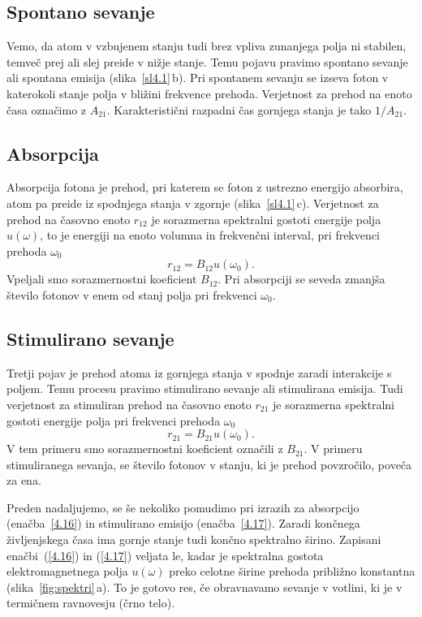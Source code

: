 \subsection*{Spontano sevanje}
Vemo, da atom v vzbujenem stanju tudi brez vpliva zunanjega polja
ni stabilen, temveč prej ali slej preide v nižje stanje. Temu pojavu
pravimo spontano sevanje ali spontana emisija (slika~\ref{sl4.1}\,b). 
Pri spontanem sevanju se izseva foton v katerokoli stanje polja v bližini 
frekvence prehoda. Verjetnost za prehod na enoto časa označimo z $A_{21}$.
Karakteristični razpadni čas gornjega stanja je tako
$1/A_{21}$.

\subsection*{Absorpcija}
Absorpcija fotona je prehod, pri katerem se foton 
z ustrezno energijo absorbira, atom pa preide iz spodnjega stanja v zgornje (slika~\ref{sl4.1}\,c). 
Verjetnost za prehod na časovno enoto $r_{12}$ je sorazmerna spektralni gostoti
energije polja $u(\omega)$, to je energiji na enoto volumna in frekvenčni interval, 
pri frekvenci prehoda $\omega_{0}$
\begin{equation}
r_{12}=B_{12}u(\omega_{0}).
\label{4.16}
\end{equation}
Vpeljali smo sorazmernostni koeficient $B_{12}$. Pri absorpciji se
seveda zmanjša število fotonov v enem od stanj polja pri frekvenci
$\omega_{0}$.

\subsection*{Stimulirano sevanje}
Tretji pojav je prehod atoma iz gornjega stanja v spodnje zaradi interakcije
s poljem. Temu procesu pravimo stimulirano sevanje ali 
stimulirana emisija. Tudi verjetnost za stimuliran prehod na časovno enoto $r_{21}$ 
je sorazmerna spektralni gostoti energije polja pri frekvenci prehoda $\omega_{0}$
\begin{equation}
r_{21}=B_{21}u(\omega_{0}).
\label{4.17}
\end{equation}
V tem primeru smo sorazmernostni koeficient označili z $B_{21}$. V primeru
stimuliranega sevanja, se število fotonov v stanju, ki je prehod povzročilo, poveča za ena. 


Preden nadaljujemo, se še nekoliko pomudimo pri izrazih za absorpcijo
(enačba~\ref{4.16}) in stimulirano emisijo (enačba~\ref{4.17}).
Zaradi končnega življenjskega časa ima gornje
stanje tudi končno spektralno širino. Zapisani enačbi~(\ref{4.16}) in (\ref{4.17})
veljata le, kadar je spektralna gostota elektromagnetnega polja $u(\omega)$
preko celotne širine prehoda približno konstantna (slika~\ref{fig:spektri}\,a). To je gotovo res, če
obravnavamo sevanje v votlini, ki je v termičnem ravnovesju (črno telo). 


